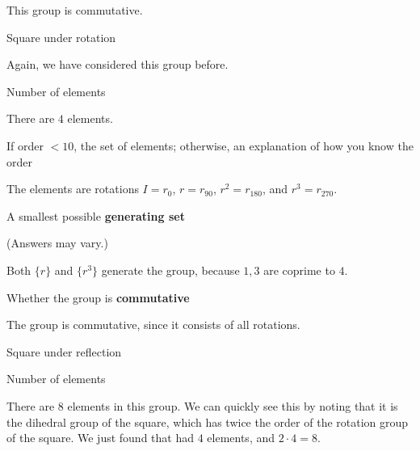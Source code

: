 \documentclass[../gatm_answers.tex]{subfiles}
\begin{document}
\noindent This group is commutative.

\begin{outer_problem}
\item Square under rotation
\end{outer_problem}

\noindent Again, we have considered this group before.

\begin{inner_problem}[start=1]
\item Number of elements
\end{inner_problem}

\noindent There are $4$ elements.

\begin{inner_problem}
\item If order $< 10$, the set of elements; otherwise, an explanation of how you know the order
\end{inner_problem}

\noindent The elements are rotations $I=r_0$, $r=r_{90}$, $r^2=r_{180}$, and $r^3=r_{270}$.

\begin{inner_problem}
\item A smallest possible \textbf{generating set}
\end{inner_problem}

\noindent (Answers may vary.)

Both $\{r\}$ and $\{r^3\}$ generate the group, because $1,3$ are coprime to $4$.

\begin{inner_problem}
\item Whether the group is \textbf{commutative}
\end{inner_problem}

\noindent The group is commutative, since it consists of all rotations.

\begin{outer_problem}
\item Square under reflection
\end{outer_problem}

\begin{inner_problem}[start=1]
\item Number of elements
\end{inner_problem}

\noindent There are $8$ elements in this group. We can quickly see this by noting that it is the dihedral group of the square, which has twice the order of the rotation group of the square. We just found that had $4$ elements, and $2\cdot 4=8$.
\end{document}
